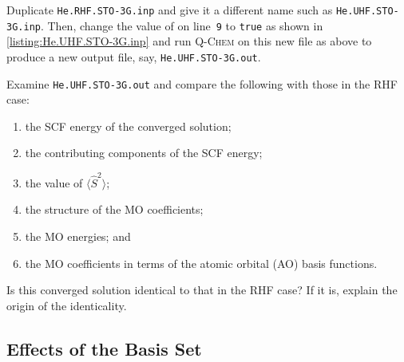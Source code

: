 		Duplicate \texttt{He.RHF.STO-3G.inp} and give it a different name such as \texttt{He.UHF.STO-3G.inp}.
		Then, change the value of  on line~\texttt{9} to \texttt{true} as shown in \cref{listing:He.UHF.STO-3G.inp} and run \textsc{Q-Chem} on this new file as above to produce a new output file, say, \texttt{He.UHF.STO-3G.out}.
			
			\begin{Task}
				Examine \texttt{He.UHF.STO-3G.out} and compare the following with those in the RHF case: 
				\begin{enumerate}[topsep=0pt,itemsep=-1ex,partopsep=1ex,parsep=1ex,label=(\alph*)]
					\item the SCF energy of the converged solution;
					\item the contributing components of the SCF energy;
					\item the value of $\langle \hat{S}^2 \rangle$;
					\item the structure of the MO coefficients;
					\item the MO energies; and
					\item the MO coefficients in terms of the atomic orbital (AO) basis functions.
				\end{enumerate}
				Is this converged solution identical to that in the RHF case? If it is, explain the origin of the identicality.
			\end{Task}

		
	\subsection{Effects of the Basis Set}
	